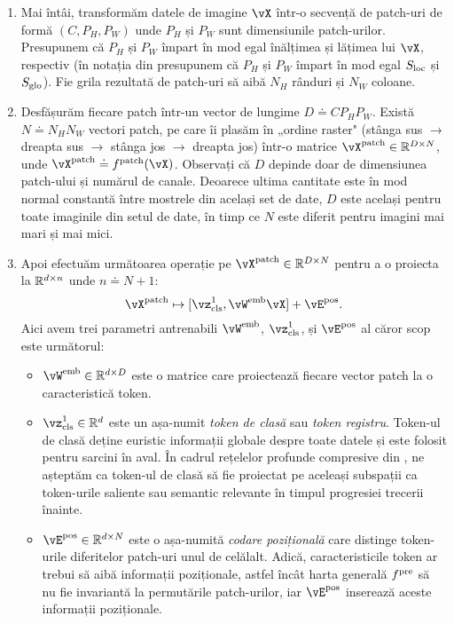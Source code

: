 \documentclass[../../book-main_ro.tex]{subfiles}
\begin{document}
\begin{enumerate}
    \item Mai întâi, transformăm datele de imagine \(\vX\) într-o secvență de patch-uri de formă \((C, P_{H}, P_{W})\) unde \(P_{H}\) și \(P_{W}\) sunt dimensiunile patch-urilor. Presupunem că \(P_{H}\) și \(P_{W}\) împart în mod egal înălțimea și lățimea lui \(\vX\), respectiv (în notația din  presupunem că \(P_{H}\) și \(P_{W}\) împart în mod egal \(S_{\mathrm{loc}}\) și \(S_{\mathrm{glo}}\)). Fie grila rezultată de patch-uri să aibă \(N_{H}\) rânduri și \(N_{W}\) coloane.
    \item Desfășurăm fiecare patch într-un vector de lungime \(D \doteq CP_{H}P_{W}\). Există \(N \doteq N_{H}N_{W}\) vectori patch, pe care îi plasăm în „ordine raster" (stânga sus \(\to\) dreapta sus \(\to\) stânga jos \(\to\) dreapta jos) într-o matrice \(\vX^{\patch} \in \R^{D \times N}\), unde \(\vX^{\patch} \doteq f^{\patch}(\vX)\). Observați că \(D\) depinde doar de dimensiunea patch-ului și numărul de canale. Deoarece ultima cantitate este în mod normal constantă între mostrele din același set de date, \(D\) este același pentru toate imaginile din setul de date, în timp ce \(N\) este diferit pentru imagini mai mari și mai mici.
    \item Apoi efectuăm următoarea operație pe \(\vX^{\patch} \in \R^{D \times N}\) pentru a o proiecta la \(\mathbb{R}^{d \times n}\) unde \(n \doteq N + 1\):
    \begin{equation}
        \vX^{\patch} \mapsto [\vz_{\cls}^{1}, \vW^{\emb}\vX] + \vE^{\pos}.
    \end{equation}
    Aici avem trei parametri antrenabili \(\vW^{\emb}\), \(\vz_{\cls}^{1}\), și \(\vE^{\pos}\) al căror scop este următorul:
    \begin{itemize}
        \item \(\vW^{\emb} \in \R^{d \times D}\) este o matrice care proiectează fiecare vector patch la o caracteristică token.
        \item \(\vz_{\cls}^{1} \in \R^{d}\) este un așa-numit \textit{token de clasă} sau \textit{token registru}. Token-ul de clasă deține euristic informații globale despre toate datele și este folosit pentru sarcini în aval. În cadrul rețelelor profunde compresive din , ne așteptăm ca token-ul de clasă să fie proiectat pe aceleași subspații ca token-urile saliente sau semantic relevante în timpul progresiei trecerii înainte.
        \item \(\vE^{\pos} \in \R^{d \times N}\) este o așa-numită \textit{codare pozițională} care distinge token-urile diferitelor patch-uri unul de celălalt. Adică, caracteristicile token ar trebui să aibă informații poziționale, astfel încât harta generală \(f^{\mathrm{pre}}\) să nu fie invariantă la permutările patch-urilor, iar \(\vE^{\pos}\) inserează aceste informații poziționale. 

\end{itemize}
\end{enumerate}
\end{document}
